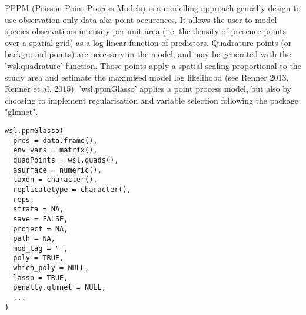 \documentclass[a4paper]{book}
\begin{document}
\begin{Examples}
\end{Examples}
%
\begin{Description}\relax
PPPM (Poisson Point Process Models) is a modelling approach genrally design to use
observation-only data aka point occurences. It allows the user to model species observations
intensity per unit area (i.e. the density of presence points over a spatial grid) as a log
linear function of predictors. Quadrature points (or background points) are necessary in the
model, and may be generated with the 'wsl.quadrature' function. Those points apply a spatial
scaling proportional to the study area and estimate the maximised model log likelihood (see
Renner 2013, Renner et al. 2015). 'wsl.ppmGlasso' applies a point process model, but also by
choosing to implement regularisation and variable selection following the package "glmnet".
\end{Description}
%
\begin{Usage}
\begin{verbatim}
wsl.ppmGlasso(
  pres = data.frame(),
  env_vars = matrix(),
  quadPoints = wsl.quads(),
  asurface = numeric(),
  taxon = character(),
  replicatetype = character(),
  reps,
  strata = NA,
  save = FALSE,
  project = NA,
  path = NA,
  mod_tag = "",
  poly = TRUE,
  which_poly = NULL,
  lasso = TRUE,
  penalty.glmnet = NULL,
  ...
)
\end{verbatim}
\end{Usage}
%
\end{document}
